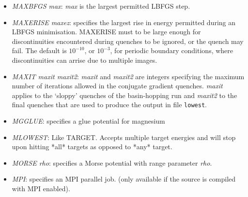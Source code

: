 \documentclass[12pt,a4paper,dvips]{article}
\begin{document}
\begin{itemize}
\item {\it MAXBFGS max\/}: {\it max\/} is the largest permitted LBFGS step.

\item {\it MAXERISE maxez\/}: specifies the largest rise in energy permitted during an LBFGS 
minimisation.  MAXERISE must to be large enough for discontinuities encountered
during quenches to be ignored, or the quench may fail.  The default is
$10^{-10}$, or $10^{-3}$, for periodic boundary conditions, where
discontinuities can arrise due to multiple images.

\item {\it MAXIT maxit maxit2\/}: {\it maxit\/} and {\it maxit2\/} are integers specifying the
maximum number of iterations allowed in the conjugate gradient quenches. {\it maxit\/} applies
to the `sloppy' quenches of the basin-hopping run and {\it maxit2\/} to the final quenches
that are used to produce the output in file {\tt lowest}.

\item {\it MGGLUE\/}: specifies a glue potential for magnesium

\item {\it MLOWEST\/}: Like TARGET. Accepts multiple target energies and will stop upon hitting *all* targets as opposed to *any* target.

\item {\it MORSE rho\/}: specifies a Morse potential 
with range parameter {\it rho\/}.\cite{braierbw90,doyewb95,doyew96a}

\item {\it MPI\/}: specifies an MPI parallel job.
(only available if the source is compiled with MPI enabled).  


\end{itemize}
\end{document}
